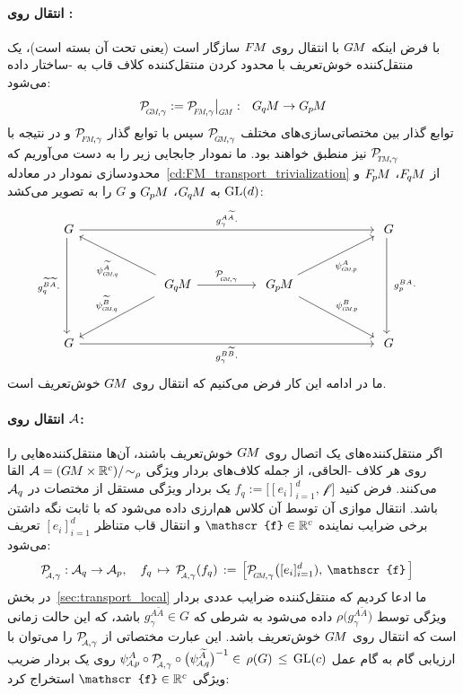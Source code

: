 \paragraph{انتقال روی :}
با فرض اینکه $G\mkern-1.4muM$ با انتقال روی $F\mkern-1.5muM$ سازگار است (یعنی تحت آن بسته است)، یک منتقل‌کننده خوش‌تعریف با محدود کردن منتقل‌کننده کلاف قاب به -ساختار داده می‌شود:
\begin{align}\label{eq:transporter_GM_def}
	\PGMgamma := \PFMgamma \big|_{\scalebox{.62}{$\GM$}}:\ \ \GqM \to \GpM
\end{align}
توابع گذار بین مختصاتی‌سازی‌های مختلف $\PGMgamma$ سپس با توابع گذار $\PFMgamma$ و در نتیجه با $\PTMgamma$ نیز منطبق خواهند بود.
ما نمودار جابجایی زیر را به دست می‌آوریم که محدودسازی نمودار در معادله~\eqref{cd:FM_transport_trivialization} از $F_{\mkern-1.5mu q}\mkern-1.1muM$، $F_{\mkern-1.5mu p}\mkern-1.0muM$ و $\operatorname{GL}(d)$ به $G_{\mkern-1.3mu q}\mkern-1.3muM$، $G_{\mkern-1.3mu p}\mkern-1.2muM$ و $G$ را به تصویر می‌کشد:
\begin{equation}\label{cd:transport_GM_triv}
	\begin{tikzcd}[column sep=60pt, row sep=30, font=\normalsize]
		G
		\arrow[dd, "g_q^{\widetilde{B}\widetilde{A}}\cdot\ "']
		\arrow[rrr, "g_\gamma^{A\widetilde{A}}\cdot"]
		& &[-3ex] &
		G
		\arrow[dd, "\ g_p^{BA}\cdot"]
		\\
		&
		\GqM
		\arrow[ul, "\psiGMq^{\widetilde{A}}", pos=.45]
		\arrow[dl, "\psiGMq^{\widetilde{B}}"', pos=.45]
		\arrow[r, "\PGMgamma"]
		&
		\GpM
		\arrow[ur, "\psiGMp^A"', pos=.45]
		\arrow[dr, "\psiGMp^B", pos=.45]
		\\
		G
		\arrow[rrr, "g_\gamma^{B\widetilde{B}}\cdot"']
		& & &
		G
	\end{tikzcd}
	\quad
\end{equation}
ما در ادامه این کار فرض می‌کنیم که انتقال روی $G\mkern-1.4muM$ خوش‌تعریف است.





\paragraph{انتقال روی $\mathcal{A}$:}
اگر منتقل‌کننده‌های یک اتصال روی $G\mkern-1.4muM$ خوش‌تعریف باشند، آن‌ها منتقل‌کننده‌هایی را روی هر کلاف -الحاقی، از جمله کلاف‌های بردار ویژگی $\mathcal{A}=(G\mkern-1.4muM\times\mathbb{R}^c)/\!\sim_\rho$ القا می‌کنند.
فرض کنید $f_q := \big[[e_i]_{i=1}^d,\,\mathscr{f}\:\!\big]$ یک بردار ویژگی مستقل از مختصات در $\mathcal{A}_q$ باشد.
انتقال موازی آن توسط آن کلاس هم‌ارزی داده می‌شود که با ثابت نگه داشتن برخی ضرایب نماینده $\mathscr{f}\in \R^c$ و انتقال قاب متناظر $[e_i]_{i=1}^d$ تعریف می‌شود:
\begin{align}\label{eq:transporter_A_def}
	\PAgamma: \A_q &\to \A_p, \quad
	f_q \,\mapsto\, \PAgamma(f_q) \,:=\, \pig[\PGMgamma\big([e_i]_{i=1}^d),\: \mathscr{f} \,\pig]
\end{align}
در بخش~\ref{sec:transport_local} ما ادعا کردیم که منتقل‌کننده ضرایب عددی بردار ویژگی توسط $\rho\big(g_\gamma^{A\widetilde{A}}\big)$ داده می‌شود به شرطی که $g_\gamma^{A\widetilde{A}}\in G$ باشد، که این حالت زمانی است که انتقال روی $G\mkern-1.4muM$ خوش‌تعریف باشد.
این عبارت مختصاتی از $\PAgamma$ را می‌توان با ارزیابی گام به گام عمل
$\psiAp^A \circ \PAgamma \circ \big(\psiAq^{\widetilde{A}}\big)^{-1} \in\, \rho(G)\, \leq\, \GL{c}$
روی یک بردار ضریب ویژگی $\mathscr{f}\in\R^c$ استخراج کرد:

